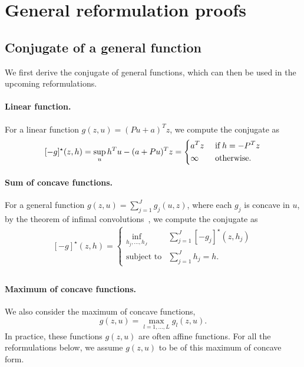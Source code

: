 \section{General reformulation proofs}
\label{appx:reform}
\subsection{Conjugate of a general function}
We first derive the conjugate of general functions, which can then be used in the upcoming reformulations.
\paragraph{Linear function.}
For a linear function $g(z,u) = (Pu + a)^Tz$, we compute the conjugate as
\begin{equation*}
	\label{c4:eq:conj_affine}
	[-g]^\star(z,h) =  \sup_u h^Tu - (a + Pu)^Tz =
	\begin{dcases}
            a^Tz  & \text{ if}\; h = -P^Tz \\
		\infty & \text{ otherwise}.
	\end{dcases}
\end{equation*}
\paragraph{Sum of concave functions.}
For a general function $g(z,u) = \sum_{j=1}^J g_j(u,z)$, where each $g_j$ is concave in $u$, by the theorem of infimal convolutions~\cite[Theorem 11.23(a), p. 493]{rockafellar_wets_1998}, we compute the conjugate as
\begin{equation*}
	\begin{aligned}
	\label{eq:conj_gen}
	[-g]^\star(z,h) =  \begin{cases}  \underset{h_j,\dots,h_J}{\inf} & \sum_{j=1}^J [-g_j]^\star(z,h_j) \\
		\mbox{subject to} & \sum_{j=1}^J h_j = h.
	\end{cases}\\
\end{aligned}
	\end{equation*}

\paragraph{Maximum of concave functions.}
We also consider the maximum of concave functions, $$g(z,u) = \max_{l=1,\dots,L} g_l(z,u).$$ In practice, these functions $g(z,u)$ are often affine functions. For all the reformulations below, we assume $g(z,u)$ to be of this maximum of concave form.

